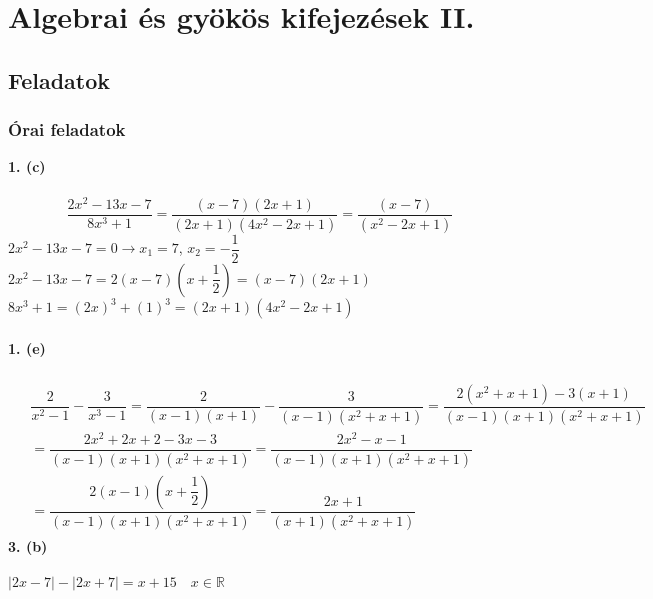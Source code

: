 \documentclass[12pt,a4paper,fleqn]{article}
\begin{document}
\section{Algebrai és gyökös kifejezések II.}
\setcounter{subsection}{1}
\subsection{Feladatok}
\subsubsection{Órai feladatok}
\textbf{1. (c)} \\\\
$$ \dfrac{2x^2-13x-7}{8x^3+1} = \dfrac{(x-7)(2x+1)}{(2x+1)(4x^2-2x+1)} = \dfrac{(x-7)}{(x^2-2x+1)}$$
$2x^2-13x-7=0 \rightarrow x_1 = 7$, $x_2 = -\dfrac{1}{2}$ \\
$2x^2-13x-7=2(x-7)(x+\dfrac{1}{2})=(x-7)(2x+1)$ \\
$ 8x^3 + 1 = (2x)^3 + (1)^3 = (2x+1)(4x^2-2x+1)$ \\\\
\textbf{1. (e)} \\\\
\begin{align*}
  \begin{split}
    & \dfrac{2}{x^2-1} -\dfrac{3}{x^3-1} = \dfrac{2}{(x-1)(x+1)} - \dfrac{3}{(x-1)(x^2+x+1)} = \dfrac{2(x^2+x+1)-3(x+1)}{(x-1)(x+1)(x^2+x+1)} \\[10pt]
    &= \dfrac{2x^2+2x+2-3x-3}{(x-1)(x+1)(x^2+x+1)} = \dfrac{2x^2-x-1}{(x-1)(x+1)(x^2+x+1)} \\[10pt]
    &= \dfrac{2(x-1)(x+\dfrac{1}{2})}{(x-1)(x+1)(x^2+x+1)} = \dfrac{2x+1}{(x+1)(x^2+x+1)}
  \end{split}
\end{align*}
\textbf{3. (b)} \\\\
$|2x-7|-|2x+7|=x+15 \quad x \in \mathbb{R}$
\end{document}
